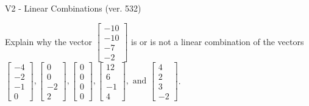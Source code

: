 \begin{exercise}
  \begin{exerciseTitle}V2 - Linear Combinations (ver. 532)\end{exerciseTitle}
  \begin{exerciseStatement}
    Explain why the vector \(\left[\begin{array}{c}
-10 \\
-10 \\
-7 \\
-2
\end{array}\right]\)  is or is not a linear 
	combination of the vectors \(\left[\begin{array}{c}
-4 \\
-2 \\
-1 \\
0
\end{array}\right] , \left[\begin{array}{c}
0 \\
0 \\
-2 \\
2
\end{array}\right] , \left[\begin{array}{c}
0 \\
0 \\
0 \\
0
\end{array}\right] , \left[\begin{array}{c}
12 \\
6 \\
-1 \\
4
\end{array}\right] , \text{ and } \left[\begin{array}{c}
4 \\
2 \\
3 \\
-2
\end{array}\right]\).
	



\end{exerciseStatement}
\end{exercise}

